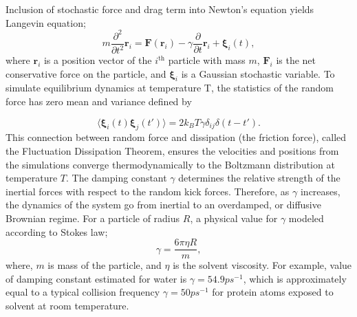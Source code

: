 \documentclass[../talant.diss.submit.tex]{subfiles}
\begin{document}
Inclusion of stochastic force and drag term into Newton's equation yields Langevin equation;
%
%
\begin{equation}
  \label{eq:Lange}
  m \frac{ \partial^2}{\partial{t^2}} \bm{r}_i = \bm{F}(\bm{r}_i)
  - \gamma \frac{ \partial}{\partial{t}} \bm{r}_i  + \bm{\xi}_i(t), 
\end{equation}
%
%
where $\bm{r}_i$ is a position vector of the $i^{\mathrm{th}}$ particle with mass $m$,
$\bm{F}_i$ is the net
conservative force on the particle, and $\bm{\xi}_i$ is a Gaussian stochastic variable.
To simulate equilibrium dynamics at temperature T, the statistics of the random force
has zero mean and variance defined by 

\begin{equation}                                                                                         \label{eq:rand_force_var}                                                                                
    \langle \bm{\xi}_i(t) \bm{\xi}_j(t')\rangle = 2k_B T\gamma \delta_{ij} \delta(t-t').                        
\end{equation}                                                                                           
This connection between random force and dissipation (the friction force),  called
the Fluctuation Dissipation Theorem, ensures the velocities and positions from the
simulations converge thermodynamically to the Boltzmann distribution at temperature $T$.
The damping constant $\gamma$ determines the relative strength of the inertial forces with
respect to the random kick forces. Therefore, as $\gamma$ increases, the dynamics of the system
go from inertial to an overdamped, or diffusive Brownian regime.
For a particle of radius $R$, a physical value for $\gamma$ modeled according to Stokes law;
%
%
\begin{equation}
  \label{eq:stokes}
  \gamma = \frac{6 \pi \eta R}{m},
\end{equation}
%
%
where, $m$ is mass of the particle, and $\eta$ is the solvent viscosity.
For example, value of damping constant estimated for water is $\gamma=54.9 ps^{-1}$,
which is approximately equal to a typical collision frequency $\gamma=50 ps^{-1}$ for
protein atoms exposed to solvent at room temperature\cite{pastor:88a}.
\end{document}
